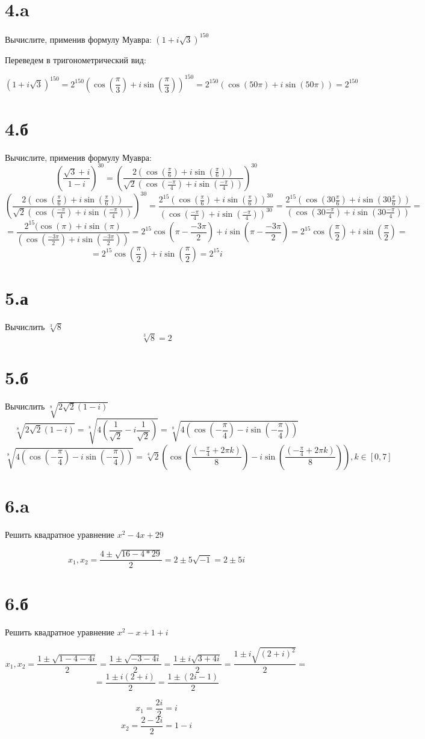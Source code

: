 \documentclass[a4paper]{article}
\begin{document}
\section*{4.a}
Вычислите, применив формулу Муавра: $(1 + i \sqrt{3})^{150}$

Переведем в тригонометрический вид:

$$(1 + i \sqrt{3})^{150} = 2^{150}(\cos(\frac{\pi}{3}) + i\sin(\frac{\pi}{3}))^{150} = 2^{150}(\cos(50\pi) + i\sin(50\pi)) = 2^{150}$$


\section*{4.б}

Вычислите, применив формулу Муавра:
$$(\frac{\sqrt{3} + i}{1 -i})^{30}=
(\frac{2(\cos(\frac{\pi}{6}) + i\sin(\frac{\pi}{6}))}{\sqrt{2}(\cos(\frac{-\pi}{4}) + i\sin(\frac{-\pi}{4}))})^{30} 
$$
$$
(\frac{2(\cos(\frac{\pi}{6}) + i\sin(\frac{\pi}{6}))}{\sqrt{2}(\cos(\frac{-\pi}{4}) + i\sin(\frac{-\pi}{4}))})^{30}  = \frac{2^{15}(\cos(\frac{\pi}{6}) + i\sin(\frac{\pi}{6}))^{30}}{(\cos(\frac{-\pi}{4}) + i\sin(\frac{-\pi}{4}))^{30}}=
\frac{2^{15}(\cos(30\frac{\pi}{6}) + i\sin(30\frac{\pi}{6}))}{(\cos(30\frac{-\pi}{4}) + i\sin(30\frac{-\pi}{4}))}
=$$
$$ 
=
\frac{2^{15}(\cos(\pi) + i\sin(\pi)}{(\cos(\frac{-3\pi}{2}) + i\sin(\frac{-3\pi}{2}))}=
2^{15}\cos(\pi - \frac{-3\pi}{2}) + i\sin(\pi - \frac{-3\pi}{2})=
2^{15}\cos(\frac{\pi}{2}) + i\sin(\frac{\pi}{2})=
$$
$$
= 2^{15}\cos(\frac{\pi}{2}) + i\sin(\frac{\pi}{2}) = 2^{15}i
$$

\section*{5.а}
Вычислить $\sqrt[3]{8}$
$$\sqrt[3]{8} = 2$$

\section*{5.б}
Вычислить $\sqrt[8]{2\sqrt{2}(1 - i)}$
$$\sqrt[8]{2\sqrt{2}(1 - i)} = \sqrt[8]{4(\frac{1}{\sqrt{2}} - i\frac{1}{\sqrt{2}})} = \sqrt[8]{4(\cos(-\frac{\pi}{4}) - i\sin(-\frac{\pi}{4}))}$$
$$\sqrt[8]{4(\cos(-\frac{\pi}{4}) - i\sin(-\frac{\pi}{4}))} =\sqrt[4]{2} (\cos(\frac{(-\frac{\pi}{4} + 2 \pi k)}{8}) - i\sin(\frac{(-\frac{\pi}{4} + 2 \pi k)}{8})), k \in [0, 7] $$

\section*{6.a}
Решить квадратное уравнение $x^2 - 4x	 + 29$


$$x_1, x_2 = \frac{4 \pm \sqrt{16-  4 * 29}}{2} = 2 \pm 5 \sqrt{-1} = 2 \pm 5 i$$
\section*{6.б}
Решить квадратное уравнение $x^2 - x	 + 1 + i$


$$x_1, x_2 = \frac{1 \pm \sqrt{1 -  4 - 4i}}{2} =\frac{1 \pm \sqrt{-3 - 4i}}{2} = \frac{1 \pm i\sqrt{3 + 4i}}{2} = \frac{1 \pm i\sqrt{(2 + i)^2}}{2}= $$
$$=\frac{1 \pm i(2 + i)}{2} =\frac{1 \pm (2i - 1)}{2} $$

$$x_1 = \frac{2i}{2} = i$$
$$x_2 = \frac{2 - 2i}{2} = 1- i$$
\end{document}

